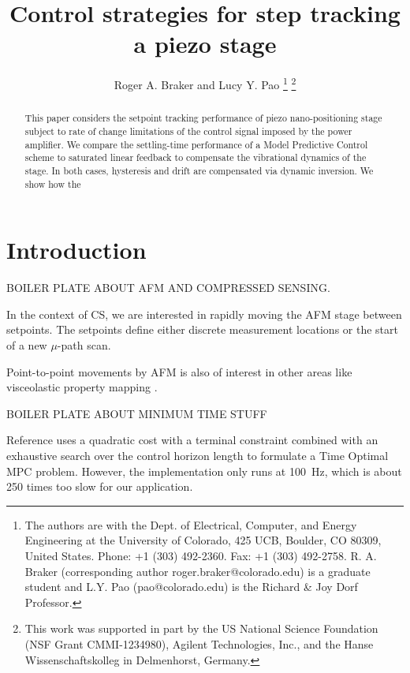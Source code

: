 \documentclass[journal,twocolumn,twoside]{IEEEtran}
\begin{document}
\title{Control strategies for step tracking a piezo stage}
\author{Roger A. Braker and Lucy Y. Pao
  \thanks{The authors are with the Dept. of Electrical, Computer, and Energy Engineering at the University of Colorado, 425 UCB, Boulder, CO 80309, United States. Phone: +1 (303) 492-2360. Fax: +1 (303) 492-2758.
    R. A.  Braker (corresponding author roger.braker@colorado.edu) is a graduate student and
    L.Y. Pao (pao@colorado.edu) is the Richard \& Joy Dorf Professor.}
  \thanks{This work was supported in part by the US National Science Foundation (NSF Grant CMMI-1234980), Agilent Technologies, Inc., and the Hanse Wissenschaftskolleg in Delmenhorst, Germany.}
}

\maketitle
\begin{abstract}
  This paper considers the setpoint tracking performance of piezo nano-positioning stage subject to rate of change limitations of the control signal imposed by the power amplifier. We compare the settling-time performance of a Model Predictive Control scheme to saturated linear feedback to compensate the vibrational dynamics of the stage. In both cases, hysteresis and drift are compensated via dynamic inversion. We show how the 
\end{abstract}


\section{Introduction}
\label{sec:orge362f71}
BOILER PLATE ABOUT AFM AND COMPRESSED SENSING.
 \newline

In the context of CS, we are interested in rapidly moving the AFM stage between setpoints. The setpoints define either discrete measurement locations or the start of a new \(\mu\)-path scan.

Point-to-point movements by AFM is also of interest in other areas like visceolastic property mapping \cite{killgore_visceolastic_2011}.\newline

BOILER PLATE ABOUT MINIMUM TIME STUFF

Reference \cite{broeck_time_2009} uses a quadratic cost with a terminal constraint combined with an exhaustive search over the control horizon length to formulate a Time Optimal MPC problem. However, the implementation only runs at 100~Hz, which is about 250 times too slow for our application. 
\newline
\end{document}
